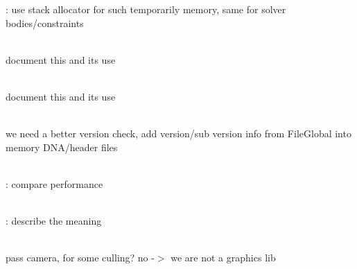 \begin{DoxyRefList}
\label{todo__todo000005}%
%
\+: use stack allocator for such temporarily memory, same for solver bodies/constraints  
\item[Member \doxylink{classb3_quaternion_aa7fad2b19aeceda85a232ec98f3f49fc}{b3\+Quaternion\+::farthest} (const \doxylink{classb3_quaternion}{b3\+Quaternion} \&qd) const]\hfill \\
\label{todo__todo000002}%
%
document this and it\textquotesingle{}s use  
\item[Member \doxylink{classb3_quaternion_a1d6d1a80f6ef65a132c1b3f7ad926b29}{b3\+Quaternion\+::nearest} (const \doxylink{classb3_quaternion}{b3\+Quaternion} \&qd) const]\hfill \\
\label{todo__todo000003}%
%
document this and it\textquotesingle{}s use  
\item[Member \doxylink{classb_parse_1_1b_file_a2a8cb9d151dfa612f0eb86a705f4bb5d}{b\+Parse\+::b\+File\+::parse\+Internal} (int verbose\+Mode, char \texorpdfstring{$\ast$}{*}mem\+Dna, int mem\+Dna\+Length)]\hfill \\
\label{todo__todo000007}%
%
we need a better version check, add version/sub version info from File\+Global into memory DNA/header files  
\item[Member \doxylink{classbt_axis_sweep3_internal_a4e26f4f8acf63f26451f6396223001bb}{bt\+Axis\+Sweep3\+Internal\texorpdfstring{$<$}{<} BP\+\_\+\+FP\+\_\+\+INT\+\_\+\+TYPE \texorpdfstring{$>$}{>}\+::remove\+Handle} (BP\+\_\+\+FP\+\_\+\+INT\+\_\+\+TYPE handle, \doxylink{classbt_dispatcher}{bt\+Dispatcher} \texorpdfstring{$\ast$}{*}dispatcher)]\hfill \\
\label{todo__todo000008}%
%
\+: compare performance  
\item[Class \doxylink{classbt_collision_configuration}{bt\+Collision\+Configuration} ]\hfill \\
\label{todo__todo000010}%
%
\+: describe the meaning  
\item[Member \doxylink{classbt_collision_world_ac1ca6489c220005798069152c3df0d08}{bt\+Collision\+World\+::debug\+Draw\+Object} (const bt\+Transform \&world\+Transform, const bt\+Collision\+Shape \texorpdfstring{$\ast$}{*}shape, const bt\+Vector3 \&color)]\hfill \\
\label{todo__todo000011}%
%
pass camera, for some culling? no -\/\texorpdfstring{$>$}{>} we are not a graphics lib  

\end{DoxyRefList}
